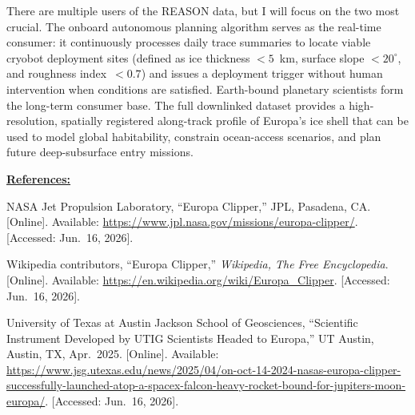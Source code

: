 \documentclass[11pt]{article}
\begin{document}
\begin{enumerate}[label=\Roman*., leftmargin=2.5em, itemsep=0.75em]
    There are multiple users of the REASON data, but I will focus on the two most crucial. The onboard
    autonomous planning algorithm serves as the real-time consumer: it continuously
    processes daily trace summaries to locate viable cryobot deployment sites (defined
    as ice thickness ${<}5$~km, surface slope ${<}20^{\circ}$, and roughness
    index~${<}0.7$) and issues a deployment trigger without human intervention when
    conditions are satisfied. Earth-bound planetary scientists form the long-term consumer
    base. The full downlinked dataset provides a high-resolution, spatially registered
    along-track profile of Europa's ice shell that can be used to model global
    habitability, constrain ocean-access scenarios, and plan future deep-subsurface entry
    missions.

\end{enumerate}

\bigskip

\newpage
\noindent\textbf{\underline{References:}}

\begin{enumerate}[label={[\arabic*]}, leftmargin=3em, itemsep=0.25em]

    \item NASA Jet Propulsion Laboratory, ``Europa Clipper,'' JPL, Pasadena, CA.
    [Online]. Available: \url{https://www.jpl.nasa.gov/missions/europa-clipper/}.
    [Accessed: Jun.\ 16, 2026].

    \item Wikipedia contributors, ``Europa Clipper,'' \textit{Wikipedia, The Free
    Encyclopedia}. [Online]. Available:
    \url{https://en.wikipedia.org/wiki/Europa_Clipper}.
    [Accessed: Jun.\ 16, 2026].

    \item University of Texas at Austin Jackson School of Geosciences,
    ``Scientific Instrument Developed by UTIG Scientists Headed to Europa,''
    UT Austin, Austin, TX, Apr.\ 2025. [Online]. Available:
    \url{https://www.jsg.utexas.edu/news/2025/04/on-oct-14-2024-nasas-europa-clipper-successfully-launched-atop-a-spacex-falcon-heavy-rocket-bound-for-jupiters-moon-europa/}.
    [Accessed: Jun.\ 16, 2026].

\end{enumerate}
\end{document}
